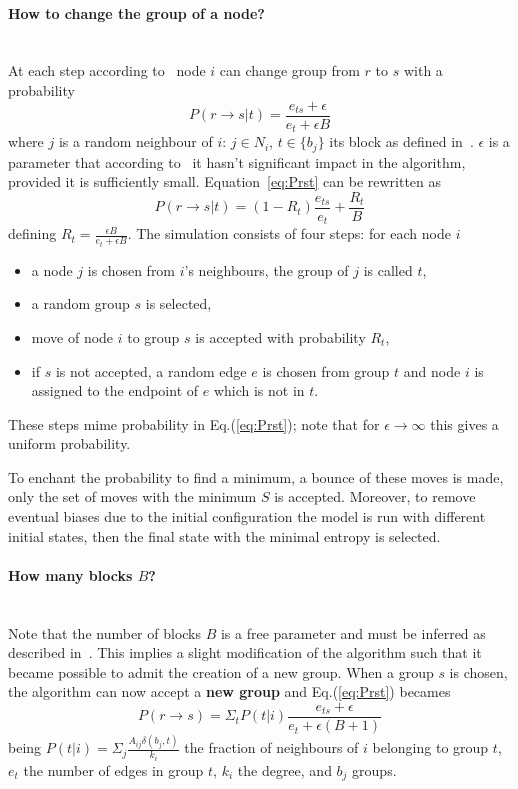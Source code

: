 \paragraph{How to change the group of a node?}\mbox{}\\
At each step according to~\cite{peixoto2014efficient} node $i$ can change group from $r$ to $s$ with a probability
\begin{equation}\label{eq:Prst}
  P(r\to s|t)=\frac{e_{ts}+\epsilon}{e_t+\epsilon B}
\end{equation}
where $j$ is a random neighbour of $i$: $j\in N_i$, $t\in\{b_j\}$ its block as defined in~\cite{peixoto2014efficient}. $\epsilon$ is a parameter that according to~\cite{peixoto2017nonparametric} it hasn't significant impact in the algorithm, provided it is sufficiently small.
Equation~\ref{eq:Prst} can be rewritten as \[P(r\to s|t)=(1-R_t)\frac{e_{ts}}{e_t}+\frac{R_t}{B}\] defining $R_t=\frac{\epsilon B}{e_t + \epsilon B}$.
The simulation consists of four steps: for each node $i$
\begin{itemize}
  \item a node $j$ is chosen from $i$'s neighbours, the group of $j$ is called
  $t$,
  \item a random group $s$ is selected,
  \item move of node $i$ to group $s$ is accepted with probability $R_t$,
  \item if $s$ is not accepted, a random edge $e$ is chosen from group $t$ and node $i$ is assigned to the endpoint of $e$ which is not in $t$.
\end{itemize}
These steps mime probability in Eq.(\ref{eq:Prst}); note that for $\epsilon\to\infty$ this gives a uniform probability.

To enchant the probability to find a minimum, a bounce of these moves is made, only the set of moves with the minimum $S$ is accepted. Moreover, to remove eventual biases due to the initial configuration the model is run with different initial states, then the final state with the minimal entropy is selected.

\paragraph{How many blocks $B$?}\mbox{}\\
Note that the number of blocks $B$ is a free parameter and must be inferred as described in~\cite{peixoto2017nonparametric}. This implies a slight modification of the algorithm such that it became possible to admit the creation of  a new group.
When a group $s$ is chosen, the algorithm can now accept a \textbf{new group} and Eq.(\ref{eq:Prst}) becames
\begin{equation}\label{eq:PrstB1}
  P(r\to s)=\Sigma_t P(t|i)\frac{e_{ts}+\epsilon}{e_t+\epsilon (B+1)}
\end{equation}
being $P(t|i)=\Sigma_j\frac{A_{ij}\delta(b_j, t)}{k_i}$ the fraction of neighbours of $i$ belonging to group $t$, $e_t$ the number of edges in group $t$,
$k_i$ the degree, and $b_j$ groups.

